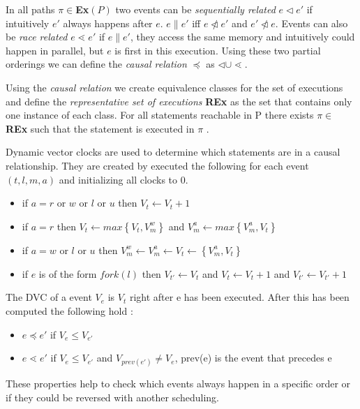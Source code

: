 \documentclass[10pt]{llncs}
\begin{document}
In all paths $\pi \in $\textbf{Ex}$(P)$ two events can be \emph{sequentially related} $e \triangleleft e'$ if intuitively $e'$ always happens after $e$. $e \parallel e'$ iff $e \ntriangleleft e'$ and $e' \ntriangleleft e$. Events can also be \emph{race related} $e \lessdot e'$ if $e \parallel e'$, they access the same memory and intuitively could happen in parallel, but $e$ is first in this execution. Using these two partial orderings we can define the \emph{causal relation} $\preceq$ as $\triangleleft \cup \lessdot$.

Using the \emph{causal relation} we create equivalence classes for the set of executions and define the \emph{representative set of executions} \textbf{REx} as the set that contains only one instance of each class. For all statements reachable in P there exists $\pi \in$ \textbf{REx} such that the statement is executed in $\pi$ \cite[§4]{base4}.

Dynamic vector clocks are used to determine which statements are in a causal relationship. They are created by executed the following for each event $(t, l, m, a)$ and initializing all clocks to $0$.

\begin{itemize}
	\item if $a = r$ or $w$ or $l$ or $u$ then $V_t \leftarrow V_t + 1$
	\item if $a = r$ then $V_t \leftarrow max \left\lbrace V_t, V_m^w \right\rbrace$ and $V_m^a \leftarrow max \left\lbrace V_m^a, V_t \right\rbrace$
	\item  if $a = w$ or $l$ or $u$ then $V_m^w \leftarrow V_m^a \leftarrow V_t \leftarrow \left\lbrace V_m^a, V_t \right\rbrace$
	\item if $e$ is of the form $fork(l)$ then $V_{t'} \leftarrow V_t$ and $V_t \leftarrow V_t + 1$ and $V_{t'} \leftarrow V_{t'} + 1$
\end{itemize}

The DVC of a event $V_e$ is $V_t$ right after e has been executed. After this has been computed the following hold \cite[§4]{base4}:

\begin{itemize}
	\item $e \preceq e'$ if $V_e \leq V_{e'}$
	\item $e \lessdot e'$ if $V_e \leq V_{e'}$ and $V_{prev(e')} \neq V_e$, prev(e) is the event that precedes e
\end{itemize}

These properties help to check which events always happen in a specific order or if they could be reversed with another scheduling.
\end{document}

